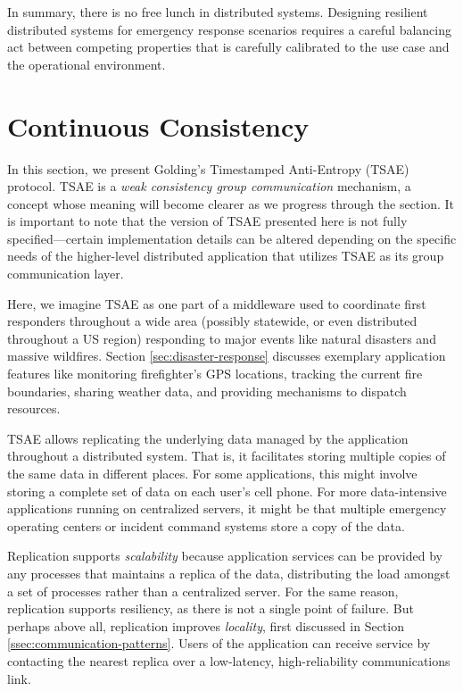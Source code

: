 \documentclass[]             %
{NASA}                       %
\theoremstyle{definition}
\begin{document}
In summary, there is no free lunch in distributed systems. Designing
resilient distributed systems for emergency response scenarios
requires a careful balancing act between competing properties that is
carefully calibrated to the use case and the operational environment.

\section{Continuous Consistency}
\label{sec:continuous-consistency}
In this section, we present Golding's Timestamped Anti-Entropy (TSAE)
protocol. TSAE is a \emph{weak consistency group communication}
mechanism, a concept whose meaning will become clearer as we progress
through the section. It is important to note that the version of TSAE
presented here is not fully specified---certain implementation details
can be altered depending on the specific needs of the higher-level
distributed application that utilizes TSAE as its group communication
layer.

Here, we imagine TSAE as one part of a middleware used to coordinate
first responders throughout a wide area (possibly statewide, or even
distributed throughout a US region) responding to major events like
natural disasters and massive wildfires. Section
\ref{sec:disaster-response} discusses exemplary application features
like monitoring firefighter's GPS locations, tracking the current fire
boundaries, sharing weather data, and providing mechanisms to dispatch
resources.

TSAE allows replicating the underlying data managed by the application
throughout a distributed system. That is, it facilitates storing
multiple copies of the same data in different places. For some
applications, this might involve storing a complete set of data on
each user's cell phone. For more data-intensive applications running
on centralized servers, it might be that multiple emergency operating
centers or incident command systems store a copy of the data.

Replication supports \emph{scalability} because application services
can be provided by any processes that maintains a replica of the data,
distributing the load amongst a set of processes rather than a
centralized server. For the same reason, replication supports
resiliency, as there is not a single point of failure. But perhaps
above all, replication improves \emph{locality}, first discussed in
Section \ref{ssec:communication-patterns}. Users of the application
can receive service by contacting the nearest replica over a
low-latency, high-reliability communications link.
\end{document}
